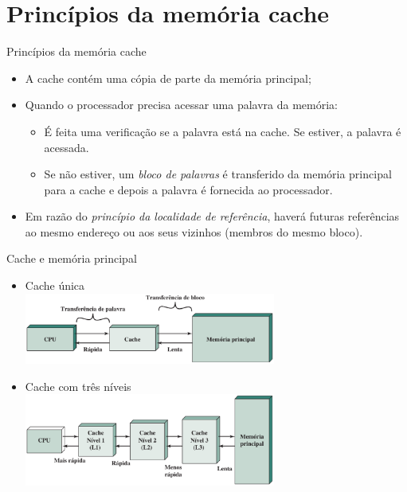 \section[slide=true]{Princípios da memória cache}
\begin{slide}{Princípios da memória cache}
\begin{itemize}
   \item A cache contém uma cópia de parte da memória principal;
   \item Quando o processador precisa acessar uma palavra da memória:
   \begin{itemize}
      \item É feita uma verificação se a palavra está na cache. Se estiver, a palavra é acessada.
      \item Se não estiver, um \emph{bloco de palavras} é transferido da memória principal para a cache e depois a palavra é fornecida ao processador.
   \end{itemize}
   \item Em razão do \emph{princípio da localidade de referência}, haverá futuras referências ao mesmo endereço ou aos seus vizinhos (membros do mesmo bloco).
\end{itemize}
\end{slide}

\begin{slide}{Cache e memória principal}
	\begin{itemize}
		\item Cache única\\
			{\centering
			\includegraphics[width=0.65\textwidth]{figs/cache-unica}}
		\item Cache com três níveis\\
			{\centering
			\includegraphics[width=0.65\textwidth]{figs/cache-tres-niveis}}
	\end{itemize}
\end{slide}

